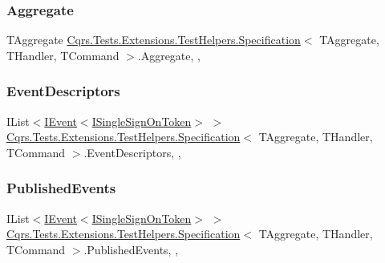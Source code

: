 \subsubsection{\texorpdfstring{Aggregate}{Aggregate}}
{\footnotesize\ttfamily T\+Aggregate \hyperlink{classCqrs_1_1Tests_1_1Extensions_1_1TestHelpers_1_1Specification}{Cqrs.\+Tests.\+Extensions.\+Test\+Helpers.\+Specification}$<$ T\+Aggregate, T\+Handler, T\+Command $>$.Aggregate\hspace{0.3cm}{\ttfamily [get]}, {\ttfamily [set]}, {\ttfamily [protected]}}

\mbox{\label{classCqrs_1_1Tests_1_1Extensions_1_1TestHelpers_1_1Specification_a64d70170c7d5056bbb910074a4935c69}} 
\subsubsection{\texorpdfstring{Event\+Descriptors}{EventDescriptors}}
{\footnotesize\ttfamily I\+List$<$\hyperlink{interfaceCqrs_1_1Events_1_1IEvent}{I\+Event}$<$\hyperlink{interfaceCqrs_1_1Authentication_1_1ISingleSignOnToken}{I\+Single\+Sign\+On\+Token}$>$ $>$ \hyperlink{classCqrs_1_1Tests_1_1Extensions_1_1TestHelpers_1_1Specification}{Cqrs.\+Tests.\+Extensions.\+Test\+Helpers.\+Specification}$<$ T\+Aggregate, T\+Handler, T\+Command $>$.Event\+Descriptors\hspace{0.3cm}{\ttfamily [get]}, {\ttfamily [set]}, {\ttfamily [protected]}}

\mbox{\label{classCqrs_1_1Tests_1_1Extensions_1_1TestHelpers_1_1Specification_a2b0b0aa01344e00e92a1908054520d53}} 
\subsubsection{\texorpdfstring{Published\+Events}{PublishedEvents}}
{\footnotesize\ttfamily I\+List$<$\hyperlink{interfaceCqrs_1_1Events_1_1IEvent}{I\+Event}$<$\hyperlink{interfaceCqrs_1_1Authentication_1_1ISingleSignOnToken}{I\+Single\+Sign\+On\+Token}$>$ $>$ \hyperlink{classCqrs_1_1Tests_1_1Extensions_1_1TestHelpers_1_1Specification}{Cqrs.\+Tests.\+Extensions.\+Test\+Helpers.\+Specification}$<$ T\+Aggregate, T\+Handler, T\+Command $>$.Published\+Events\hspace{0.3cm}{\ttfamily [get]}, {\ttfamily [set]}, {\ttfamily [protected]}}


